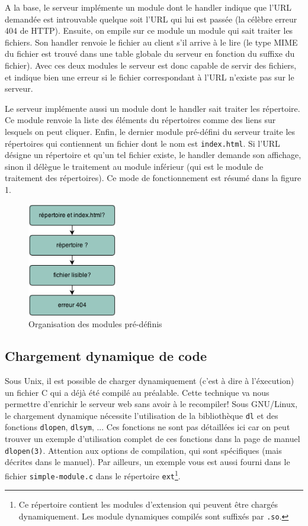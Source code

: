 \documentclass[10pt,a4paper]{article}
\begin{document}
A la base, le serveur implémente un module dont le handler indique
que l'URL demandée est introuvable quelque soit l'URL qui lui est
passée (la célèbre erreur 404 de HTTP). Ensuite, on empile sur ce module
un module qui sait traiter les fichiers. Son handler renvoie le
fichier au client s'il arrive à le lire (le type MIME du fichier est
trouvé dans une table globale du serveur en fonction du suffixe du
fichier).  Avec ces deux modules le serveur est donc capable de servir
des fichiers, et indique bien une erreur si le fichier correspondant à
l'URL n'existe pas sur le serveur.

Le serveur implémente aussi un module dont le handler sait traiter les
répertoire. Ce module renvoie la liste des éléments du répertoires
comme des liens sur lesquels on peut cliquer. Enfin, le dernier module
pré-défini du serveur traite les répertoires qui contiennent un
fichier dont le nom est \texttt{index.html}. Si l'URL désigne un répertoire et qu'un tel fichier existe,
le handler demande son affichage, sinon il délègue le traitement au
module inférieur (qui est le module de traitement des répertoires).
Ce mode de fonctionnement est résumé dans la figure 1.

\begin{figure}
  \centering
  \includegraphics[height=5cm]{Ressources/figure1.png}
  \caption{Organisation des modules pré-définis}
  \label{fig:1}
\end{figure}

\subsection*{Chargement dynamique de code}

Sous Unix, il est possible de charger dynamiquement (c'est à dire à
l'éxecution) un fichier C qui a déjà été compilé au préalable. Cette
technique va nous permettre d'enrichir le serveur web sans avoir à le
recompiler! Sous GNU/Linux, le chargement dynamique nécessite
l'utilisation de la bibliothèque \texttt{dl} et des fonctions
\texttt{dlopen}, \texttt{dlsym}, ... Ces fonctions ne sont pas
détaillées ici car on peut trouver un exemple d'utilisation complet de
ces fonctions dans la page de manuel \texttt{dlopen(3)}. Attention aux
options de compilation, qui sont spécifiques (mais décrites dans le
manuel).  Par ailleurs, un exemple vous est aussi fourni dans le
fichier \texttt{simple-module.c} dans le répertoire
\texttt{ext}\footnote{Ce répertoire contient les modules d'extension
  qui peuvent être chargés dynamiquement. Les module dynamiques
  compilés sont suffixés par \texttt{.so}.}.
\end{document}
